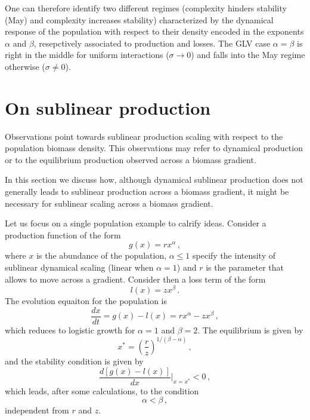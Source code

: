 \documentclass[10pt]{article}
\begin{document}
One can therefore identify two different regimes (complexity hinders stability (May) and 
complexity increases stability)
characterized by the dynamical response of the population with respect to their density
encoded in the exponents $\alpha$ and $\beta$, resepctively associated
to production and losses. The GLV case $\alpha=\beta$ is right in the middle for uniform
interactions ($\sigma\to0$) and falls into the May regime otherwise ($\sigma\neq0$). 

\section{On sublinear production}
\label{sec: On sublinear production}
Observations point towards sublinear production scaling
with respect to the population biomass density. 
This observations may refer to
dynamical production or to the equilibrium production observed
across a biomass gradient.

In this section we discuss how, although dynamical sublinear production
does not generally leads to sublinear production across a biomass
gradient, it might be necessary for sublinear scaling across a biomass gradient.

Let us focus on a single population example to calrify ideas.
Consider a production function of the form
\begin{equation}
    g(x) = r x^\alpha \, ,
\label{eq: production}
\end{equation}
where $x$ is the abundance of the population, $\alpha\leq1$
specify the intensity of sublinear dynamical scaling (linear when $\alpha=1$) 
and $r$ is the parameter that allows to move across a gradient.
Consider then a loss term of the form
\begin{equation}
    l(x) = z x^\beta \, .
\end{equation} 
The evolution equaiton for the population is 
\begin{equation}
    \frac{dx}{dt} = g(x) - l(x) = r x^\alpha - z x^\beta \, ,
    \label{eq: single}
\end{equation} 
which reduces to logistic growth for $\alpha=1$ and $\beta=2$.
The equilibrium is given by
\begin{equation}
    x^* = \left(\frac{r}{z}\right)^{1/(\beta-\alpha)} \, ,
\label{eq: equilibrium single}
\end{equation}
and the stability condition is given by
\begin{equation}
    \frac{d\left[g(x)-l(x)\right]}{dx}\bigg|_{x=x^*} < 0 \, ,
\end{equation}
which leads, after some calculations, to the condition
\begin{equation}
    \alpha<\beta \, ,
\end{equation}
independent from $r$ and $z$.
\end{document}
